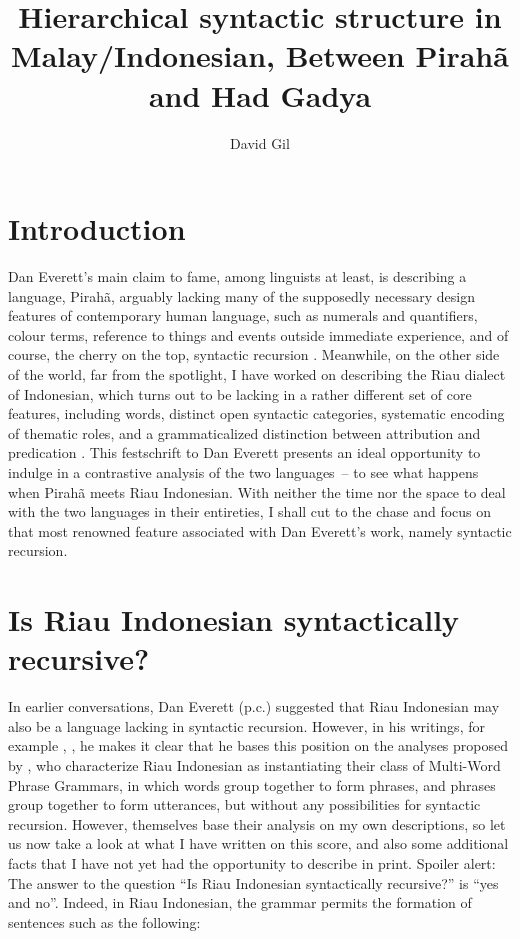 \documentclass[output=paper,colorlinks,citecolor=brown
]{langscibook}
\author{David Gil\affiliation{Max Planck Institute for Evolutionary Anthropology}}
\title[Hierarchical syntactic structure in Malay/Indonesian]{Hierarchical syntactic structure in Malay/Indonesian,
Between Pirahã and Had Gadya}
\begin{document}
\maketitle

\section{Introduction}
\begin{sloppypar}
Dan Everett's main claim to fame, among linguists at least, is describing a language, Pirahã, arguably lacking many of the supposedly necessary design features of contemporary human language, such as numerals and quantifiers, colour terms, reference to things and events outside immediate experience, and of course, the cherry on the top, syntactic recursion \citep{everett2005cultural}. Meanwhile, on the other side of the world, far from the spotlight, I have worked on describing the Riau dialect of Indonesian, which turns out to be lacking in a rather different set of core features, including words, distinct open syntactic categories, systematic encoding of thematic roles, and a grammaticalized distinction between attribution and predication \citep{gil2005word,gil2006intonation,gil2012predication,gil2013riau, gil2017isolating, gil2020isolating}. This festschrift to Dan Everett presents an ideal opportunity to indulge in a contrastive analysis of the two languages~– to see what happens when Pirahã meets Riau Indonesian. With neither the time nor the space to deal with the two languages in their entireties, I shall cut to the chase and focus on that most renowned feature associated with Dan Everett's work, namely syntactic recursion.
\end{sloppypar}

\section{Is Riau Indonesian syntactically recursive?}

In earlier conversations, Dan Everett (p.c.) suggested that Riau Indonesian may also be a language lacking in syntactic recursion. However, in his writings, for example \citet{futrell2016corpus}, \citet{everett2017grammar}, he makes it clear that he bases this position on the analyses proposed by \citet{jackendoff2014syntax, jackendoff2017linear}, who characterize Riau Indonesian as instantiating their class of Multi-Word Phrase Grammars, in which words group together to form phrases, and phrases group together to form utterances, but without any possibilities for syntactic recursion. However, \citet{jackendoff2014syntax, jackendoff2017linear} themselves base their analysis on my own descriptions, so let us now take a look at what I have written on this score, and also some additional facts that I have not yet had the opportunity to describe in print. Spoiler alert: The answer to the question ``Is Riau Indonesian syntactically recursive?'' is ``yes and no''.
Indeed, in Riau Indonesian, the grammar permits the formation of sentences such as the following:
\end{document}
